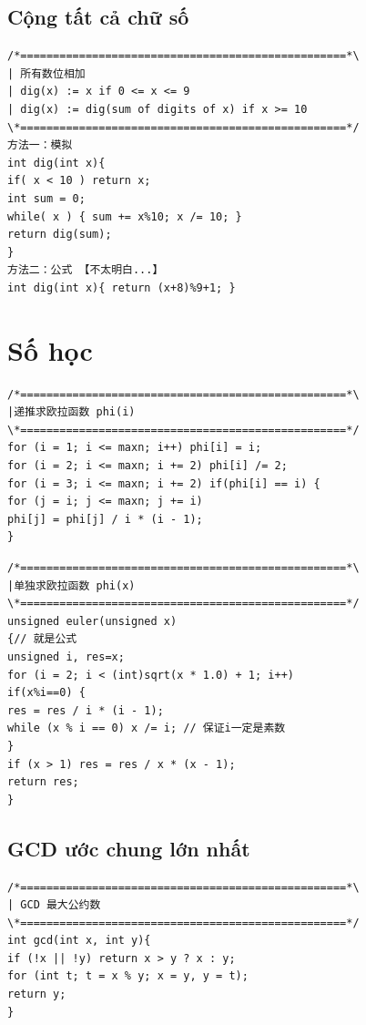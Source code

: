 \documentclass[11pt]{article}
\begin{document}
\subsection{Cộng tất cả chữ số}

\begingroup
\scriptsize
\begin{verbatim}
/*==================================================*\
| 所有数位相加
| dig(x) := x if 0 <= x <= 9
| dig(x) := dig(sum of digits of x) if x >= 10
\*==================================================*/
方法一：模拟
int dig(int x){
if( x < 10 ) return x;
int sum = 0;
while( x ) { sum += x%10; x /= 10; }
return dig(sum);
}
方法二：公式 【不太明白...】
int dig(int x){ return (x+8)%9+1; }
\end{verbatim}
\endgroup

\section{Số học}

\begingroup
\scriptsize
\begin{verbatim}
/*==================================================*\
|递推求欧拉函数 phi(i)
\*==================================================*/
for (i = 1; i <= maxn; i++) phi[i] = i;
for (i = 2; i <= maxn; i += 2) phi[i] /= 2;
for (i = 3; i <= maxn; i += 2) if(phi[i] == i) {
for (j = i; j <= maxn; j += i)
phi[j] = phi[j] / i * (i - 1);
}
\end{verbatim}
\endgroup

\begingroup
\scriptsize
\begin{verbatim}
/*==================================================*\
|单独求欧拉函数 phi(x)
\*==================================================*/
unsigned euler(unsigned x)
{// 就是公式
unsigned i, res=x;
for (i = 2; i < (int)sqrt(x * 1.0) + 1; i++)
if(x%i==0) {
res = res / i * (i - 1);
while (x % i == 0) x /= i; // 保证i一定是素数
}
if (x > 1) res = res / x * (x - 1);
return res;
}
\end{verbatim}
\endgroup

\subsection{GCD ước chung lớn nhất}

\begingroup
\scriptsize
\begin{verbatim}
/*==================================================*\
| GCD 最大公约数
\*==================================================*/
int gcd(int x, int y){
if (!x || !y) return x > y ? x : y;
for (int t; t = x % y; x = y, y = t);
return y;
}
\end{verbatim}
\endgroup
\end{document}
